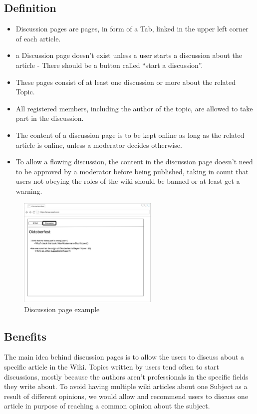 \subsection{Definition}
\begin{itemize}
\item Discussion pages are pages, in form of a Tab, linked in the upper left corner of each article. 
\item a Discussion page doesn’t exist unless a user starts a discussion about the article - There should be a button called “start a discussion”.
\item These pages consist of at least one discussion or more about the related Topic. 
\item All registered members, including the author of the topic, are allowed to take part in the discussion.
\item The content of a discussion page is to be kept online as long as the related article is online, unless a moderator decides otherwise.
\item To allow a flowing discussion, the content in the discussion page doesn’t need to be approved by a moderator before being published, taking in count that users not obeying the roles of the wiki should be banned or at least get a warning.
 \end{itemize}

 \begin{figure}[h] 
    \centering
    \includegraphics[width=0.6\textwidth]{Pictures/discussion1.jpg}
    \caption{Discussion page example}
\end{figure} 

\subsection{Benefits}
The main idea behind discussion pages is to allow the users to discuss about a specific article in the Wiki.
Topics written by users tend often to start discussions, mostly because the authors aren’t professionals in the specific fields they write about. To avoid having multiple wiki articles about one Subject as a result of different opinions, we would allow and recommend users to discuss one article in purpose of reaching a common opinion about the subject.

